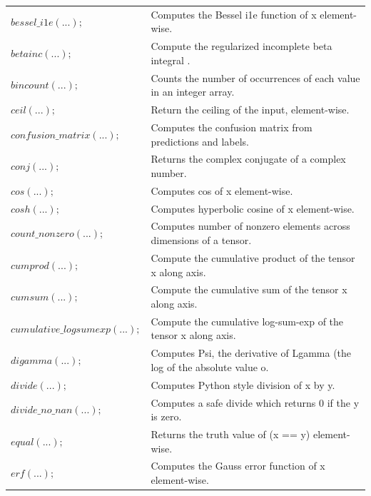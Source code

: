 \documentclass[12pt]{report}
\begin{document}
\begin{longtable}{ p{} | p{}}
$bessel\_i1e(...);$ & Computes the Bessel i1e function of x element-wise. \\ 

$betainc(...);$ & Compute the regularized incomplete beta integral . \\ 

$bincount(...);$ & Counts the number of occurrences of each value in an integer array. \\ 

$ceil(...);$ & Return the ceiling of the input, element-wise. \\ 

$confusion\_matrix(...);$ & Computes the confusion matrix from predictions and labels. \\ 

$conj(...);$ & Returns the complex conjugate of a complex number. \\ 

$cos(...);$ & Computes cos of x element-wise. \\ 

$cosh(...);$ & Computes hyperbolic cosine of x element-wise. \\ 

$count\_nonzero(...);$ & Computes number of nonzero elements across dimensions of a tensor. \\ 

$cumprod(...);$ & Compute the cumulative product of the tensor x along axis. \\ 

$cumsum(...);$ & Compute the cumulative sum of the tensor x along axis. \\ 

$cumulative\_logsumexp(...);$ & Compute the cumulative log-sum-exp of the tensor x along axis. \\ 

$digamma(...);$ & Computes Psi, the derivative of Lgamma (the log of the absolute value o. \\ 

$divide(...);$ & Computes Python style division of x by y. \\ 

$divide\_no\_nan(...);$ & Computes a safe divide which returns 0 if the y is zero. \\ 

$equal(...);$ & Returns the truth value of (x == y) element-wise. \\ 

$erf(...);$ & Computes the Gauss error function of x element-wise. \\ 


\end{longtable}
\end{document}
